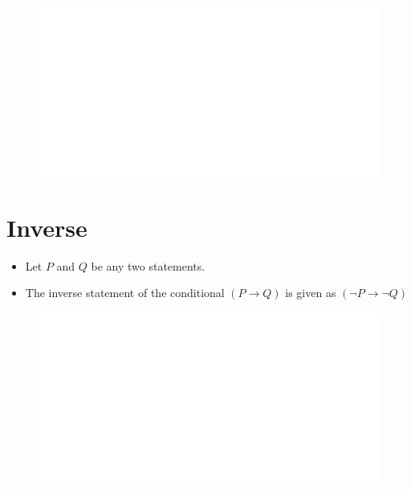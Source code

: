 \documentclass[]{book}
\providecommand{\tightlist}{%
  \setlength{\itemsep}{0pt}\setlength{\parskip}{0pt}}
\begin{document}
\begin{figure}

{\centering \includegraphics[width=1\linewidth]{figure/boxC31-1} 

}

\end{figure}

\hypertarget{inverse}{%
\section{Inverse}\label{inverse}}

\begin{itemize}
\tightlist
\item
  Let \(P\) and \(Q\) be any two statements.
\item
  The inverse statement of the conditional \((P \rightarrow Q)\) is given as \((\lnot P \rightarrow \lnot Q)\)
\end{itemize}

\begin{figure}

{\centering \includegraphics[width=1\linewidth]{figure/boxC32-1} 

}

\end{figure}
\end{document}
